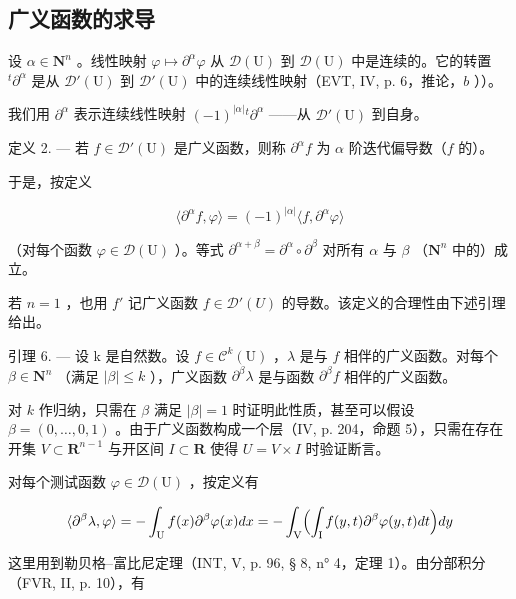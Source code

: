 \subsection{广义函数的求导}

设 \(\alpha \in \mathbf{N}^n\) 。线性映射 \(\varphi \mapsto \partial^\alpha \varphi\) 从 \(\mathcal{D}(\mathrm{U})\) 到 \(\mathcal{D}(\mathrm{U})\) 中是连续的。它的转置 \(^t\partial^\alpha\) 是从 \(\mathcal{D}'(\mathrm{U})\) 到 \(\mathcal{D}'(\mathrm{U})\) 中的连续线性映射（EVT, IV, p. 6，推论，\(b\) ））。

我们用 \(\partial^{\alpha}\) 表示连续线性映射 \((-1)^{|\alpha|}{}^{t}\partial^{\alpha}\) ——从 \(\mathcal{D}'(\mathrm{U})\) 到自身。

定义 2. --- 若 \(f \in \mathcal{D}'(\mathrm{U})\) 是广义函数，则称 \(\partial^{\alpha} f\) 为 \(\alpha\) 阶迭代偏导数（\(f\) 的）。

于是，按定义

\[
\langle \partial^ {\alpha} f, \varphi \rangle = (- 1) ^ {| \alpha |} \langle f, \partial^ {\alpha} \varphi \rangle
\]

（对每个函数 \(\varphi\in\mathcal{D}(\mathrm{U})\) ）。等式 \(\partial^{\alpha+\beta}=\partial^{\alpha}\circ\partial^{\beta}\) 对所有 \(\alpha\) 与 \(\beta\) （\(\mathbf{N}^{n}\) 中的）成立。

若 \(n=1\) ，也用 \(f'\) 记广义函数 \(f\in\mathcal{D}'(U)\) 的导数。该定义的合理性由下述引理给出。

引理 6. --- 设 k 是自然数。设 \(f \in \mathcal{C}^k(\mathrm{U})\) ，\(\lambda\) 是与 \(f\) 相伴的广义函数。对每个 \(\beta \in \mathbf{N}^n\) （满足 \(|\beta| \leqslant k\) ），广义函数 \(\partial^\beta\lambda\) 是与函数 \(\partial^\beta f\) 相伴的广义函数。

对 \(k\) 作归纳，只需在 \(\beta\) 满足 \(|\beta| = 1\) 时证明此性质，甚至可以假设 \(\beta = (0, \ldots, 0, 1)\) 。由于广义函数构成一个层（IV, p. 204，命题 5），只需在存在开集 \(V \subset \mathbf{R}^{n-1}\) 与开区间 \(I \subset \mathbf{R}\) 使得 \(U = V \times I\) 时验证断言。

对每个测试函数 \(\varphi\in\mathcal{D}(\mathrm{U})\) ，按定义有

\[
\langle \partial^ {\beta} \lambda , \varphi \rangle = - \int_ {\mathrm{U}} f (x) \partial^ {\beta} \varphi (x) d x = - \int_ {\mathrm{V}} \Bigl (\int_ {\mathrm{I}} f (y, t) \partial^ {\beta} \varphi (y, t) d t \Bigr) d y
\]

这里用到勒贝格--富比尼定理（INT, V, p. 96, § 8, n° 4，定理 1）。由分部积分（FVR, II, p. 10），有

